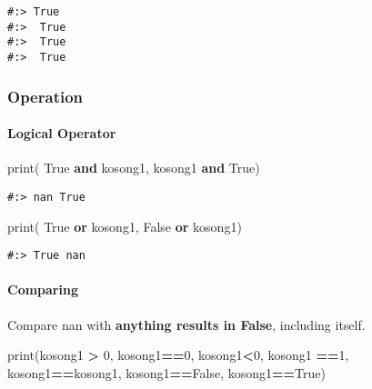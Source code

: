 \documentclass[
]{book}
\newenvironment{Shaded}{\begin{snugshade}}{\end{snugshade}}
\newcommand{\BuiltInTok}[1]{#1}
\newcommand{\DecValTok}[1]{\textcolor[rgb]{0.06,0.06,0.06}{#1}}
\newcommand{\KeywordTok}[1]{\textcolor[rgb]{0.27,0.27,0.27}{\textbf{#1}}}
\newcommand{\NormalTok}[1]{#1}
\newcommand{\OperatorTok}[1]{\textcolor[rgb]{0.43,0.43,0.43}{\textbf{#1}}}
\newcommand{\VariableTok}[1]{\textcolor[rgb]{0,0,0}{#1}}
\begin{document}
\begin{verbatim}
#:> True 
#:>  True 
#:>  True 
#:>  True
\end{verbatim}

\hypertarget{operation}{%
\subsubsection{Operation}\label{operation}}

\hypertarget{logical-operator}{%
\paragraph{Logical Operator}\label{logical-operator}}

\begin{Shaded}
\begin{Highlighting}[]
\BuiltInTok{print}\NormalTok{( }\VariableTok{True} \KeywordTok{and}\NormalTok{ kosong1,}
\NormalTok{       kosong1 }\KeywordTok{and} \VariableTok{True}\NormalTok{)}
\end{Highlighting}
\end{Shaded}

\begin{verbatim}
#:> nan True
\end{verbatim}

\begin{Shaded}
\begin{Highlighting}[]
\BuiltInTok{print}\NormalTok{( }\VariableTok{True} \KeywordTok{or}\NormalTok{ kosong1,}
       \VariableTok{False} \KeywordTok{or}\NormalTok{ kosong1)}
\end{Highlighting}
\end{Shaded}

\begin{verbatim}
#:> True nan
\end{verbatim}

\hypertarget{comparing}{%
\paragraph{Comparing}\label{comparing}}

Compare nan with \textbf{anything results in False}, including itself.

\begin{Shaded}
\begin{Highlighting}[]
\BuiltInTok{print}\NormalTok{(kosong1 }\OperatorTok{\textgreater{}} \DecValTok{0}\NormalTok{, kosong1}\OperatorTok{==}\DecValTok{0}\NormalTok{, kosong1}\OperatorTok{\textless{}}\DecValTok{0}\NormalTok{,}
\NormalTok{      kosong1 }\OperatorTok{==}\DecValTok{1}\NormalTok{, kosong1}\OperatorTok{==}\NormalTok{kosong1, kosong1}\OperatorTok{==}\VariableTok{False}\NormalTok{, kosong1}\OperatorTok{==}\VariableTok{True}\NormalTok{)}
\end{Highlighting}
\end{Shaded}
\end{document}
